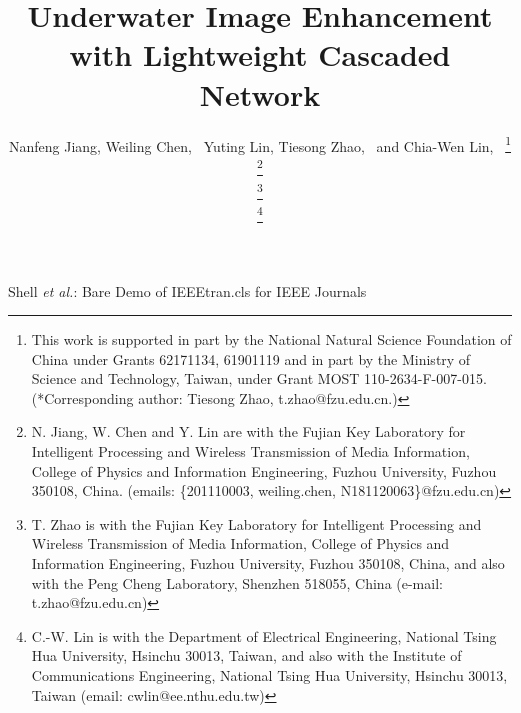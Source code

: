 \documentclass[journal]{IEEEtran}
\begin{document}
\title{Underwater Image Enhancement with Lightweight Cascaded Network}



\author{Nanfeng Jiang,
        Weiling Chen,~
        Yuting Lin,
        Tiesong Zhao,~ and Chia-Wen Lin,~%
\thanks{This work is supported in part by the National Natural Science Foundation of China under Grants 62171134, 61901119 and in part by the Ministry of Science and Technology, Taiwan, under Grant MOST 110-2634-F-007-015. (*Corresponding author: Tiesong Zhao, t.zhao@fzu.edu.cn.)}

\thanks{N. Jiang, W. Chen and Y. Lin are with the Fujian Key Laboratory for Intelligent Processing and Wireless Transmission of Media Information, College of Physics and Information Engineering, Fuzhou University, Fuzhou 350108, China. (emails: \{201110003, weiling.chen, N181120063\}@fzu.edu.cn)}%

\thanks{T. Zhao is with the Fujian Key Laboratory for Intelligent Processing and Wireless Transmission of Media Information, College of Physics and Information Engineering, Fuzhou University, Fuzhou 350108, China, and also with the Peng Cheng Laboratory, Shenzhen 518055, China (e-mail: t.zhao@fzu.edu.cn)}

\thanks{C.-W. Lin is with the Department of Electrical Engineering, National
Tsing Hua University, Hsinchu 30013, Taiwan, and also with the
Institute of Communications Engineering, National Tsing Hua University, Hsinchu 30013, Taiwan (email: cwlin@ee.nthu.edu.tw)}}%




%
{Shell \MakeLowercase{\textit{et al.}}: Bare Demo of IEEEtran.cls for IEEE Journals}





\maketitle
\end{document}
